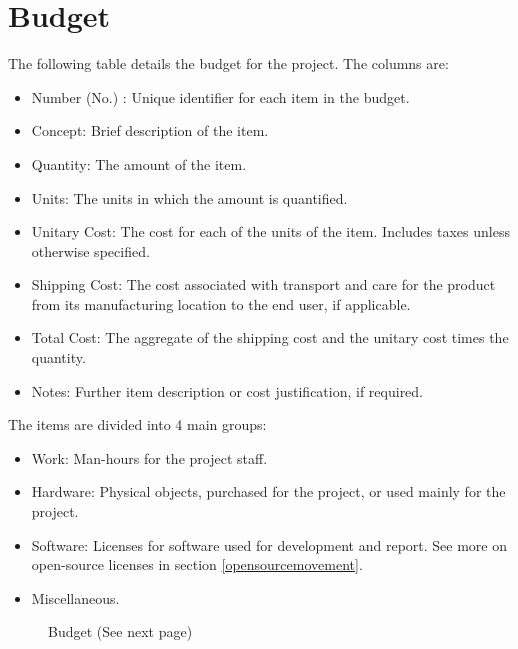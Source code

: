 \section{Budget}
The following table details the budget for the project. The columns are:
\begin{itemize}
	\item Number (No.) : Unique identifier for each item in the budget.
	\item Concept: Brief description of the item.
	\item Quantity: The amount of the item.
	\item Units: The units in which the amount is quantified.
	\item Unitary Cost: The cost for each of the units of the item. Includes taxes unless otherwise specified.
	\item Shipping Cost: The cost associated with transport and care for the product from its manufacturing location to the 
	end user, if applicable.
	\item Total Cost: The aggregate of the shipping cost and the unitary cost times the quantity.
	\item Notes: Further item description or cost justification, if required.
\end{itemize}
The items are divided into 4 main groups:
\begin{itemize}
	\item Work: Man-hours for the project staff.
	\item Hardware: Physical objects, purchased for the project, or used mainly for the project.
	\item Software: Licenses for software used for development and report. See more on open-source licenses in section 
	\ref{opensourcemovement}.
	\item Miscellaneous.
\end{itemize}
\begin{figure}[H]
\caption{Budget (See next page)\label{budget}}
\end{figure}

